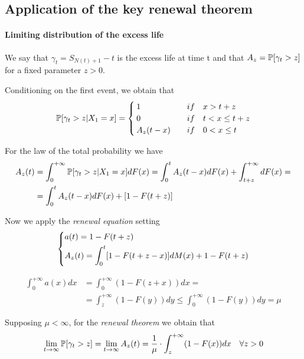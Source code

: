 \subsection{Application of the key renewal theorem}

\paragraph{Limiting distribution of the excess life}

We say that $\gamma_{t}=S_{N(t)+1}-t$ is the excess life at time t and that $A_z=\mathbb{P}[\gamma_t>z]$ for a fixed parameter $z>0$.

Conditioning on the first event, we obtain that
\begin{equation*}
	\mathbb{P}[\gamma_t>z|X_1=x] = \begin{cases}
		1 \quad & if \quad x > t+z \\
		0 \quad & if \quad t < x \le t+z \\
		A_z(t-x) \quad & if \quad 0< x \le t
	\end{cases}
\end{equation*}

For the law of the total probability we have
\begin{align*}
	A_z(t) &= \int_{0}^{+\infty} \mathbb{P}[\gamma_t>z|X_1=x] dF(x) = \int_{0}^{t}A_z(t-x)dF(x)+\int_{t+z}^{+\infty}dF(x)= \\
	&= \int_{0}^{t}A_z(t-x)dF(x)+ [1-F(t+z)]
\end{align*}

Now we apply the \textit{renewal equation} setting
\begin{equation} \begin{dcases}
	a(t) = 1 - F(t+z) \\
	A_z(t)=\int_{0}^{t} [1-F(t+z-x)] dM(x)+1-F(t+z)
\end{dcases} \end{equation}

\begin{align*}
	\int_{0}^{+\infty} a(x) dx & = \int_{0}^{+\infty}(1-F(z+x)) dx = \\
	& = \int_{z}^{+\infty}(1-F(y))dy \leq \int_{0}^{+\infty}(1-F(y))dy = \mu
\end{align*}

Supposing $\mu < \infty$, for the \textit{renewal theorem} we obtain that
\begin{equation}
	\lim_{t \rightarrow \infty} \mathbb{P}[\gamma_t>z] = \lim_{t \rightarrow \infty} A_z(t) = \frac{1}{\mu} \cdot \int_z^{+\infty}(1-F(x))dx \quad \forall z > 0
	\label{limitingdistribution}
\end{equation}

